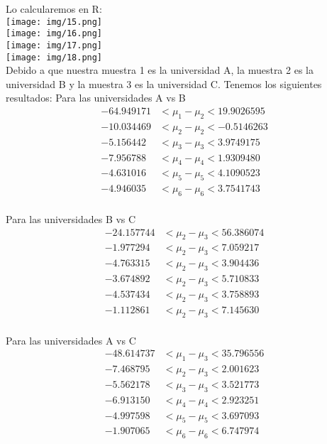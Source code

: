 \begin{sol}
Lo calcularemos en R:\\
\texttt{[image: img/15.png]}\\
\texttt{[image: img/16.png]}\\
\texttt{[image: img/17.png]}\\
\texttt{[image: img/18.png]}\\
Debido a que nuestra muestra 1 es la universidad A, la muestra 2 es la universidad B y la muestra 3 es la universidad C. Tenemos los siguientes resultados:
Para las universidades A vs B
\begin{align*}
-64.949171 &< \mu_{1} - \mu_{2} < 19.9026595 \\
-10.034469 &< \mu_{2} - \mu_{2} < -0.5146263 \\
-5.156442 &< \mu_{3} - \mu_{3} < 3.9749175 \\
-7.956788 &< \mu_{4} - \mu_{4} < 1.9309480 \\
-4.631016 &< \mu_{5} - \mu_{5} < 4.1090523 \\
-4.946035 &< \mu_{6} - \mu_{6} < 3.7541743 \\
\end{align*}

Para las universidades B vs C
\begin{align*}
-24.157744 &< \mu_{2} - \mu_{3} < 56.386074 \\
-1.977294 &< \mu_{2} - \mu_{3} < 7.059217 \\
-4.763315 &< \mu_{2} - \mu_{3} < 3.904436 \\
-3.674892 &< \mu_{2} - \mu_{3} < 5.710833 \\
-4.537434 &< \mu_{2} - \mu_{3} < 3.758893 \\
-1.112861 &< \mu_{2} - \mu_{3} < 7.145630 \\
\end{align*}

Para las universidades A vs C
\begin{align*}
-48.614737 &< \mu_{1} - \mu_{3} < 35.796556 \\
-7.468795 &< \mu_{2} - \mu_{3} < 2.001623 \\
-5.562178 &< \mu_{3} - \mu_{3} < 3.521773 \\
-6.913150 &< \mu_{4} - \mu_{4} < 2.923251 \\
-4.997598 &< \mu_{5} - \mu_{5} < 3.697093 \\
-1.907065 &< \mu_{6} - \mu_{6} < 6.747974 \\
\end{align*}


\end{sol}

